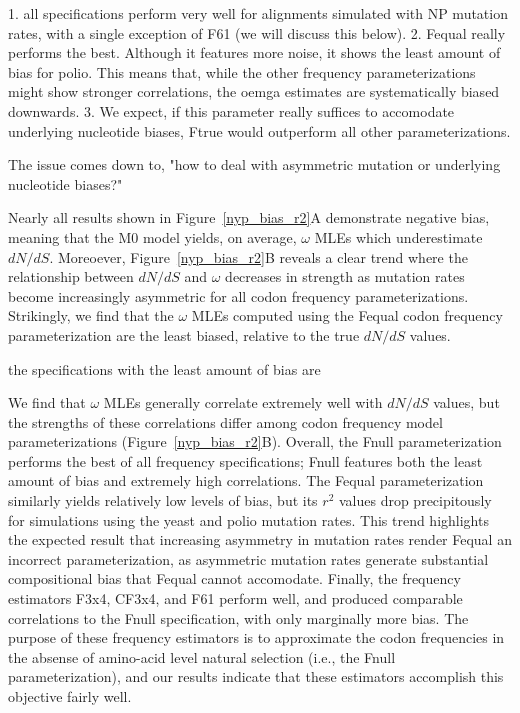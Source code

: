 \documentclass[11pt]{article}
\begin{document}
1. all specifications perform very well for alignments simulated with NP mutation rates, with a single exception of F61 (we will discuss this below).
2. Fequal really performs the best. Although it features more noise, it shows the least amount of bias for polio. This means that, while the other frequency parameterizations might show stronger correlations, the oemga estimates are systematically biased downwards. 
3. We expect, if this parameter really suffices to accomodate underlying nucleotide biases, Ftrue would outperform all other parameterizations. 

The issue comes down to, "how to deal with asymmetric mutation or underlying nucleotide biases?" 


Nearly all results shown in Figure~\ref{nyp_bias_r2}A demonstrate negative bias, meaning that the M0 model yields, on average, $\omega$ MLEs which underestimate $dN/dS$. Moreoever, Figure~\ref{nyp_bias_r2}B reveals a clear trend where the relationship between $dN/dS$ and $\omega$ decreases in strength as mutation rates become increasingly asymmetric for all codon frequency parameterizations. 
Strikingly, we find that the $\omega$ MLEs computed using the Fequal codon frequency parameterization are the least biased, relative to the true $dN/dS$ values. 

the specifications with the least amount of bias are 



We find that $\omega$ MLEs generally correlate extremely well with $dN/dS$ values, but the strengths of these correlations differ among codon frequency model parameterizations (Figure~\ref{nyp_bias_r2}B). Overall, the Fnull parameterization performs the best of all frequency specifications; Fnull features both the least amount of bias and extremely high correlations. The Fequal parameterization similarly yields relatively low levels of bias, but its $r^2$ values drop precipitously for simulations using the yeast and polio mutation rates. This trend highlights the expected result that increasing asymmetry in mutation rates render Fequal an incorrect parameterization, as asymmetric mutation rates generate substantial compositional bias that Fequal cannot accomodate. Finally, the frequency estimators F3x4, CF3x4, and F61 perform well, and produced comparable correlations to the Fnull specification, with only marginally more bias. The purpose of these frequency estimators is to approximate the codon frequencies in the absense of amino-acid level natural selection \cite{YN00,Yang2006} (i.e., the Fnull parameterization), and our results indicate that these estimators accomplish this objective fairly well. 
\end{document}
